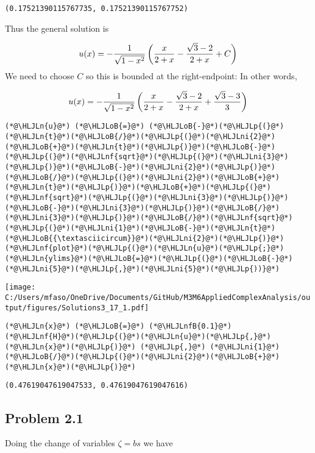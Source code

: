 \documentclass[12pt,landscape]{article}
\newcommand{\HLJLn}[1]{#1}
\newcommand{\HLJLnf}[1]{\textcolor[RGB]{66,102,213}{#1}}
\newcommand{\HLJLnfB}[1]{\textcolor[RGB]{59,151,46}{#1}}
\newcommand{\HLJLni}[1]{\textcolor[RGB]{59,151,46}{#1}}
\newcommand{\HLJLoB}[1]{\textcolor[RGB]{102,102,102}{\textbf{#1}}}
\newcommand{\HLJLp}[1]{#1}
\begin{document}
{\begin{lstlisting}
(0.17521390115767735, 0.17521390115767752)
\end{lstlisting}


Thus the general solution is

\[
u(x) = -{1 \over \sqrt{1-x^2}} \left( {x\over 2+x} -{ \sqrt{3} -2 \over 2+x} + C \right)
\]
We need to choose $C$ so this is bounded at the right-endpoint: In other words,

\[
u(x) = -{1 \over \sqrt{1-x^2}} \left( {x\over 2+x} -{ \sqrt{3} -2 \over 2+x} +{ \sqrt{3} -3 \over 3}  \right)
\]

\begin{lstlisting}
(*@\HLJLn{u}@*) (*@\HLJLoB{=}@*) (*@\HLJLoB{-}@*)(*@\HLJLp{(}@*)(*@\HLJLn{t}@*)(*@\HLJLoB{/}@*)(*@\HLJLp{(}@*)(*@\HLJLni{2}@*)(*@\HLJLoB{+}@*)(*@\HLJLn{t}@*)(*@\HLJLp{)}@*)(*@\HLJLoB{-}@*)(*@\HLJLp{(}@*)(*@\HLJLnf{sqrt}@*)(*@\HLJLp{(}@*)(*@\HLJLni{3}@*)(*@\HLJLp{)}@*)(*@\HLJLoB{-}@*)(*@\HLJLni{2}@*)(*@\HLJLp{)}@*)(*@\HLJLoB{/}@*)(*@\HLJLp{(}@*)(*@\HLJLni{2}@*)(*@\HLJLoB{+}@*)(*@\HLJLn{t}@*)(*@\HLJLp{)}@*)(*@\HLJLoB{+}@*)(*@\HLJLp{(}@*)(*@\HLJLnf{sqrt}@*)(*@\HLJLp{(}@*)(*@\HLJLni{3}@*)(*@\HLJLp{)}@*)(*@\HLJLoB{-}@*)(*@\HLJLni{3}@*)(*@\HLJLp{)}@*)(*@\HLJLoB{/}@*)(*@\HLJLni{3}@*)(*@\HLJLp{)}@*)(*@\HLJLoB{/}@*)(*@\HLJLnf{sqrt}@*)(*@\HLJLp{(}@*)(*@\HLJLni{1}@*)(*@\HLJLoB{-}@*)(*@\HLJLn{t}@*)(*@\HLJLoB{{\textasciicircum}}@*)(*@\HLJLni{2}@*)(*@\HLJLp{)}@*)
(*@\HLJLnf{plot}@*)(*@\HLJLp{(}@*)(*@\HLJLn{u}@*)(*@\HLJLp{;}@*) (*@\HLJLn{ylims}@*)(*@\HLJLoB{=}@*)(*@\HLJLp{(}@*)(*@\HLJLoB{-}@*)(*@\HLJLni{5}@*)(*@\HLJLp{,}@*)(*@\HLJLni{5}@*)(*@\HLJLp{))}@*)
\end{lstlisting}

\texttt{[image: C:/Users/mfaso/OneDrive/Documents/GitHub/M3M6AppliedComplexAnalysis/output/figures/Solutions3\_17\_1.pdf]}

\begin{lstlisting}
(*@\HLJLn{x}@*) (*@\HLJLoB{=}@*) (*@\HLJLnfB{0.1}@*)
(*@\HLJLnf{H}@*)(*@\HLJLp{(}@*)(*@\HLJLn{u}@*)(*@\HLJLp{,}@*)(*@\HLJLn{x}@*)(*@\HLJLp{)}@*) (*@\HLJLp{,}@*) (*@\HLJLni{1}@*)(*@\HLJLoB{/}@*)(*@\HLJLp{(}@*)(*@\HLJLni{2}@*)(*@\HLJLoB{+}@*)(*@\HLJLn{x}@*)(*@\HLJLp{)}@*)
\end{lstlisting}

\begin{lstlisting}
(0.47619047619047533, 0.47619047619047616)
\end{lstlisting}


\subsection{Problem 2.1}
Doing the change of variables $\zeta = b s$ we have

}
\end{document}
